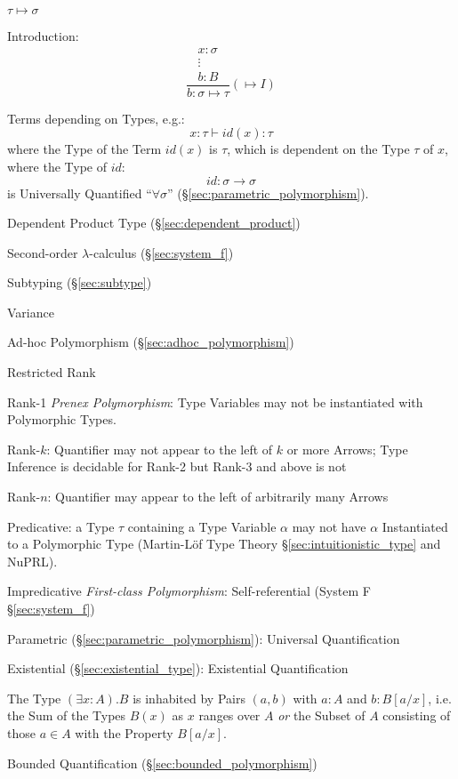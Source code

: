 $\tau \mapsto \sigma$

Introduction:
\[
  {
  \frac{
    \begin{matrix}
      x : \sigma \\
      \vdots \\
      b : B
    \end{matrix}
  }
  {b : \sigma \mapsto \tau}
  }(\mapsto I)
\]

Terms depending on Types, e.g.:
\[
  x:\tau \vdash id(x):\tau
\]
where the Type of the Term $id(x)$ is $\tau$, which is dependent on
the Type $\tau$ of $x$, where the Type of $id$:
\[
  id:\sigma \rightarrow \sigma
\]
is Universally Quantified ``$\forall \sigma$''
(\S\ref{sec:parametric_polymorphism}).

Dependent Product Type (\S\ref{sec:dependent_product})

Second-order $\lambda$-calculus (\S\ref{sec:system_f})

Subtyping (\S\ref{sec:subtype})

Variance

Ad-hoc Polymorphism (\S\ref{sec:adhoc_polymorphism})

Restricted Rank

Rank-1 \emph{Prenex Polymorphism}: Type Variables may not be
instantiated with Polymorphic Types.

Rank-$k$: Quantifier may not appear to the left of $k$ or more Arrows;
Type Inference is decidable for Rank-2 but Rank-3 and above is not

Rank-$n$: Quantifier may appear to the left of arbitrarily many Arrows

Predicative: a Type $\tau$ containing a Type Variable $\alpha$ may not
have $\alpha$ Instantiated to a Polymorphic Type (Martin-L\"of Type
Theory \S\ref{sec:intuitionistic_type} and NuPRL).

Impredicative \emph{First-class Polymorphism}: Self-referential
(System F \S\ref{sec:system_f})

Parametric (\S\ref{sec:parametric_polymorphism}): Universal
Quantification

Existential (\S\ref{sec:existential_type}): Existential Quantification

The Type $(\exists x : A).B$ is inhabited by Pairs $(a,b)$ with $a:A$
and $b:B[a/x]$, i.e. the Sum of the Types $B(x)$ as $x$ ranges over
$A$ \emph{or} the Subset of $A$ consisting of those $a \in A$ with the
Property $B[a/x]$.

Bounded Quantification (\S\ref{sec:bounded_polymorphism})



